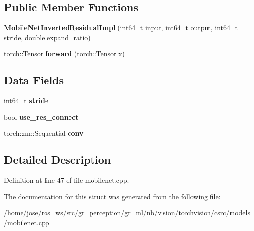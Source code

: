\subsection*{Public Member Functions}
\begin{DoxyCompactItemize}
\item 
\mbox{\label{structvision_1_1models_1_1MobileNetInvertedResidualImpl_a8c4afe4459f0aaaee94d01125899f7c7}} 
{\bfseries Mobile\+Net\+Inverted\+Residual\+Impl} (int64\+\_\+t input, int64\+\_\+t output, int64\+\_\+t stride, double expand\+\_\+ratio)
\item 
\mbox{\label{structvision_1_1models_1_1MobileNetInvertedResidualImpl_a112686c70a713de182e3faefa6d661b9}} 
torch\+::\+Tensor {\bfseries forward} (torch\+::\+Tensor x)
\end{DoxyCompactItemize}
\subsection*{Data Fields}
\begin{DoxyCompactItemize}
\item 
\mbox{\label{structvision_1_1models_1_1MobileNetInvertedResidualImpl_a8140e9204df9ce5c4fabd6de9920552c}} 
int64\+\_\+t {\bfseries stride}
\item 
\mbox{\label{structvision_1_1models_1_1MobileNetInvertedResidualImpl_a0363afdc9b88f8564dbf299ecacd7bd8}} 
bool {\bfseries use\+\_\+res\+\_\+connect}
\item 
\mbox{\label{structvision_1_1models_1_1MobileNetInvertedResidualImpl_ae217244dcc7e5b49a0bfcc0e91044de4}} 
torch\+::nn\+::\+Sequential {\bfseries conv}
\end{DoxyCompactItemize}


\subsection{Detailed Description}


Definition at line 47 of file mobilenet.\+cpp.



The documentation for this struct was generated from the following file\+:\begin{DoxyCompactItemize}
\item 
/home/jose/ros\+\_\+ws/src/gr\+\_\+perception/gr\+\_\+ml/nb/vision/torchvision/csrc/models/mobilenet.\+cpp\end{DoxyCompactItemize}
